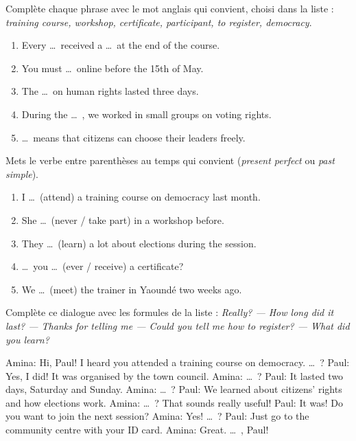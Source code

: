 \documentclass[11pt]{article}
\newcounter{popsec}
\newcounter{popsub}
\newcommand{\courssub}[1]{%
  \stepcounter{popsub}%
  \par\vspace{9pt}\noindent{\popxbold\fontsize{11.5}{13}\selectfont\color{popink}{\color{poporange}\thepopsec.\thepopsub}\hspace{6pt}#1}\par\nopagebreak\vspace{4pt}
}
\begin{document}
\begin{exercice}
Complète chaque phrase avec le mot anglais qui convient, choisi dans la liste : \emph{training course, workshop, certificate, participant, to register, democracy}.
\begin{enumerate}
\item Every \dots\ received a \dots\ at the end of the course.
\item You must \dots\ online before the 15th of May.
\item The \dots\ on human rights lasted three days.
\item During the \dots\ , we worked in small groups on voting rights.
\item \dots\ means that citizens can choose their leaders freely.
\end{enumerate}
\end{exercice}

\begin{exercice}
Mets le verbe entre parenthèses au temps qui convient (\emph{present perfect} ou \emph{past simple}).
\begin{enumerate}
\item I \dots\ (attend) a training course on democracy last month.
\item She \dots\ (never / take part) in a workshop before.
\item They \dots\ (learn) a lot about elections during the session.
\item \dots\ you \dots\ (ever / receive) a certificate?
\item We \dots\ (meet) the trainer in Yaoundé two weeks ago.
\end{enumerate}
\end{exercice}

\courssub{Je m'entraîne}

\begin{exercice}
Complète ce dialogue avec les formules de la liste : \emph{Really? — How long did it last? — Thanks for telling me — Could you tell me how to register? — What did you learn?}
\begin{textebox}
Amina: Hi, Paul! I heard you attended a training course on democracy. \dots\ ?
Paul: Yes, I did! It was organised by the town council.
Amina: \dots\ ?
Paul: It lasted two days, Saturday and Sunday.
Amina: \dots\ ?
Paul: We learned about citizens' rights and how elections work.
Amina: \dots\ ? That sounds really useful!
Paul: It was! Do you want to join the next session?
Amina: Yes! \dots\ ?
Paul: Just go to the community centre with your ID card.
Amina: Great. \dots\ , Paul!
\end{textebox}
\end{exercice}
\end{document}
